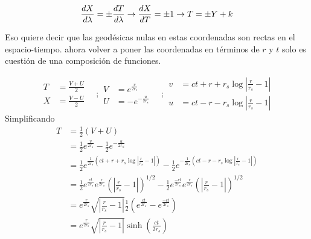 \begin{equation}
    \frac{d X}{d \lambda} =\pm \frac{d T}{d \lambda} \to \frac{d X}{d T} = \pm 1 \to T = \pm Y + k
\end{equation}

Eso quiere decir que las geodésicas nulas en estas coordenadas son rectas en el espacio-tiempo. 
ahora volver a poner las coordenadas en términos de $r$ y $t$ solo es cuestión de una composición de funciones.

\begin{equation}
    \begin{aligned}
        T&=\frac{V+U}{2} \\
        X&=\frac{V-U}{2}
    \end{aligned}
    \quad ; 
    \begin{aligned}
        V&=e^{\frac{v}{2 r_s}} \\
        U&=-e^{-\frac{u}{2 r_s}}
    \end{aligned}
    \quad ; 
    \begin{aligned}
        v&=c t+r+r_s \log \left|\frac{r}{r_s}-1\right| \\
        u&=c t-r-r_s \log \left|\frac{r}{r_s}-1\right|
    \end{aligned}
\end{equation}
Simplificando
\begin{equation}
    \begin{aligned}
        T & =  \frac{1}{2}\left(V + U\right)                                                                                                                                                      \\
          & = \frac{1}{2} e^{\frac{v}{2 r_s}}-\frac{1}{2} e^{-\frac{u}{2 r_S}}                                                                                                                    \\
          & = \frac{1}{2} e^{\frac{1}{2 r_s}\left(c t+r+r_s \log \left|\frac{r}{r_s}-1\right|\right)}-\frac{1}{2} e^{-\frac{1}{2 r_s}\left(c t-r-r_s \log \left|\frac{r}{r_s}-1\right|\right)}    \\
          & =\frac{1}{2} e^{\frac{c t}{2 r_s}} e^{\frac{r}{2 r_s}}\left(\left|\frac{r}{r_s}-1\right|\right)^{1 / 2}-\frac{1}{2} e^{\frac{-c t}{2 r_s}} e^{\frac{r}{2 r_s}}\left(\left|\frac{r}{r_s}-1\right|\right)^{1 / 2} \\
          & = e^{\frac{r}{2 r_s}} \sqrt{\left|\frac{r}{r_s}-1\right|} \frac{1}{2}\left(e^{\frac{c t}{2 r_s}}-e^{\frac{-c t}{2 r_s}}\right)                                                                     \\
          & = e^{\frac{r}{2 r_s}} \sqrt{\left|\frac{r}{r_s}-1\right|} \sinh\left(\frac{ct}{2r_s}\right)
          \label{eq:Kruskal-SzekeresT(r,t)}
    \end{aligned}
\end{equation}
